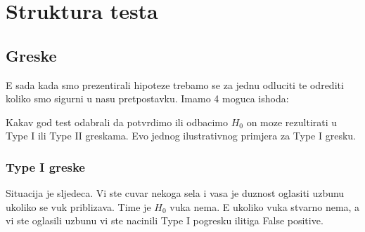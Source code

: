 \chapter{Struktura testa}

\section{Greske}

E sada kada smo prezentirali hipoteze trebamo se za jednu odluciti te odrediti koliko smo sigurni u nasu pretpostavku. Imamo 4 moguca ishoda:


\begin{table}[h]
\end{table}

Kakav god test odabrali da potvrdimo ili odbacimo $H_0$ on moze rezultirati u Type I ili Type II greskama. Evo jednog ilustrativnog primjera za Type I gresku.

\subsection{Type I greske}

Situacija je sljedeca. Vi ste cuvar nekoga sela i vasa je duznost oglasiti uzbunu ukoliko se vuk priblizava. Time je $H_0$ vuka nema. E ukoliko vuka stvarno nema, a vi ste oglasili uzbunu vi ste nacinili Type I pogresku ilitiga False positive.

